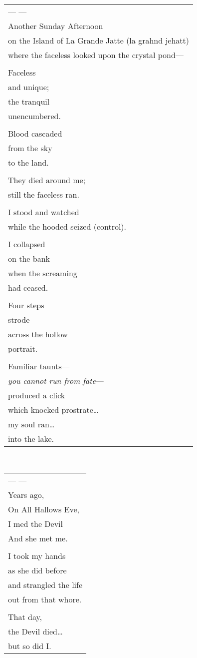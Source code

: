 \documentclass{article}
\begin{document}
\begin{tabular}{l}
\\
--- --- \\
Another Sunday Afternoon \\
on the Island of La Grande Jatte (la grahnd jehatt) \\
where the faceless looked upon the crystal pond--- \\
\\
Faceless \\
and unique; \\
the tranquil \\
unencumbered. \\
\\
Blood cascaded \\
from the sky \\
to the land. \\
\\
They died around me; \\
still the faceless ran. \\
\\
I stood and watched \\
while the hooded seized (control). \\
\\
I collapsed \\
on the bank \\
when the screaming \\
had ceased. \\
\\
Four steps \\
strode \\
across the hollow \\
portrait. \\
\\
Familiar taunts--- \\
\textit{you cannot run from fate}--- \\
produced a click \\
which knocked prostrate\ldots{} \\
my soul ran\ldots{} \\
into the lake. \\
\end{tabular} \\
\begin{tabular}{l}
\\
--- --- \\
Years ago, \\
On All Hallows Eve, \\
I med the Devil \\
And she met me. \\
\\
I took my hands \\
as she did before \\
and strangled the life \\
out from that whore. \\
\\
That day, \\
the Devil died\ldots{} \\
but so did I. \\
\end{tabular}
\end{document}
